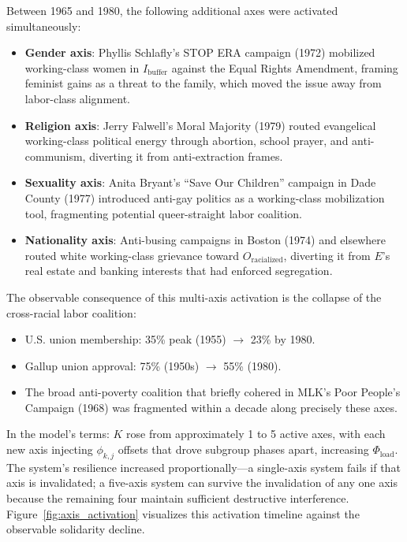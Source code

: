 Between 1965 and 1980, the following additional axes were activated simultaneously:
\begin{itemize}[leftmargin=*, nosep]
    \item \textbf{Gender axis}: Phyllis Schlafly's STOP ERA campaign (1972) mobilized working-class women in $I_{\text{buffer}}$ against the Equal Rights Amendment, framing feminist gains as a threat to the family, which moved the issue away from labor-class alignment.
    \item \textbf{Religion axis}: Jerry Falwell's Moral Majority (1979) routed evangelical working-class political energy through abortion, school prayer, and anti-communism, diverting it from anti-extraction frames.
    \item \textbf{Sexuality axis}: Anita Bryant's ``Save Our Children'' campaign in Dade County (1977) introduced anti-gay politics as a working-class mobilization tool, fragmenting potential queer-straight labor coalition.
    \item \textbf{Nationality axis}: Anti-busing campaigns in Boston (1974) and elsewhere routed white working-class grievance toward $O_{\text{racialized}}$, diverting it from $E$'s real estate and banking interests that had enforced segregation.
\end{itemize}

The observable consequence of this multi-axis activation is the collapse of the cross-racial labor coalition:
\begin{itemize}[leftmargin=*, nosep]
    \item U.S. union membership: 35\% peak (1955) $\to$ 23\% by 1980.
    \item Gallup union approval: 75\% (1950s) $\to$ 55\% (1980).
    \item The broad anti-poverty coalition that briefly cohered in MLK's Poor People's Campaign (1968) was fragmented within a decade along precisely these axes.
\end{itemize}

In the model's terms: $K$ rose from approximately 1 to 5 active axes, with each new axis injecting $\phi_{k,j}$ offsets that drove subgroup phases apart, increasing $\Phi_{\text{load}}$. The system's resilience increased proportionally---a single-axis system fails if that axis is invalidated; a five-axis system can survive the invalidation of any one axis because the remaining four maintain sufficient destructive interference. Figure~\ref{fig:axis_activation} visualizes this activation timeline against the observable solidarity decline.

